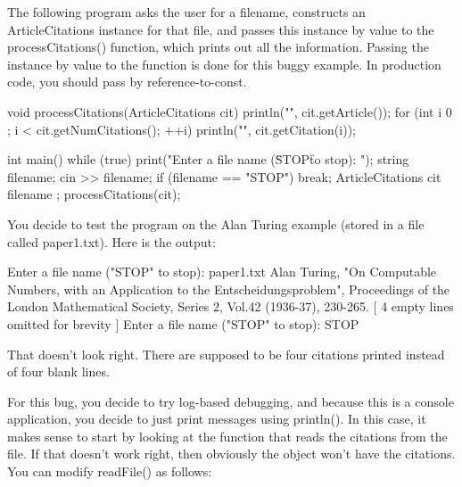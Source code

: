 
The following program asks the user for a filename, constructs an ArticleCitations instance for that file, and passes this instance by value to the processCitations() function, which prints out all the information. Passing the instance by value to the function is done for this buggy example. In production code, you should pass by reference-to-const.

\begin{cpp}
void processCitations(ArticleCitations cit)
{
    println("{}", cit.getArticle());
    for (int i { 0 }; i < cit.getNumCitations(); ++i) {
        println("{}", cit.getCitation(i));
    }
}

int main()
{
    while (true) {
        print("Enter a file name (\"STOP\" to stop): ");
        string filename;
        cin >> filename;
        if (filename == "STOP") { break; }
        ArticleCitations cit { filename };
        processCitations(cit);
    }
}
\end{cpp}

You decide to test the program on the Alan Turing example (stored in a file called paper1.txt). Here is the output:

\begin{shell}
Enter a file name ("STOP" to stop): paper1.txt
Alan Turing, "On Computable Numbers, with an Application to the
Entscheidungsproblem", Proceedings of the London Mathematical Society, Series 2,
Vol.42 (1936-37), 230-265.
[ 4 empty lines omitted for brevity ]
Enter a file name ("STOP" to stop): STOP
\end{shell}

That doesn’t look right. There are supposed to be four citations printed instead of four blank lines.


For this bug, you decide to try log-based debugging, and because this is a console application, you decide to just print messages using println(). In this case, it makes sense to start by looking at the function that reads the citations from the file. If that doesn’t work right, then obviously the object won’t have the citations. You can modify readFile() as follows:

